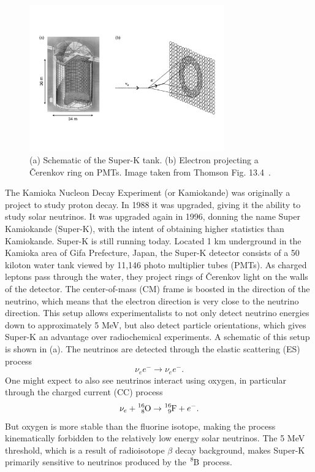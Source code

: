 \begin{figure}
  \centering
  \includegraphics[width=0.75\textwidth,keepaspectratio]
                {pictures/t13_4.pdf}
  \vspace{-10mm}
  \caption{(a) Schematic of the Super-K tank. (b) Electron
           projecting a \v{C}erenkov ring on PMTs. Image taken
           from Thomson Fig. 13.4~\cite{thomson_modern_2013}.}
  \label{fig:cerenkov}
\end{figure}

The Kamioka Nucleon Decay Experiment (or Kamiokande) was
originally a project to study proton decay. In 1988 it was
upgraded, giving it the ability to study solar neutrinos. It was upgraded
again in 1996, donning the name Super Kamiokande (Super-K), with the intent
of obtaining higher statistics than Kamiokande. Super-K is still running today.
Located 1 km underground in the Kamioka area of Gifa Prefecture, Japan,
the Super-K detector consists of a 50 kiloton water tank viewed by 11,146
photo multiplier tubes (PMTs). As charged leptons pass through the water,
they project rings of \v{C}erenkov light on the walls of the detector. The
center-of-mass (CM)
frame is boosted in the direction of the neutrino, which means that the
electron direction is very close to the neutrino direction. This setup
allows experimentalists to not only detect neutrino energies down to
approximately 5 MeV, but also detect particle orientations, which gives Super-K
an advantage over radiochemical experiments. A schematic of this setup
is shown in  (a).
The neutrinos are detected through the elastic scattering (ES) process
\begin{equation}
  \nu_ee^-\to\nu_ee^-. 
\end{equation}
One might expect to also see neutrinos interact
using oxygen, in particular through the charged current (CC) process
\begin{equation}
  \nu_e+\ce{^{16}_8O}\to\ce{^{16}_9F}+e^-.
\end{equation}
But oxygen is more stable than the fluorine isotope, making the process
kinematically forbidden to the relatively low energy solar neutrinos. The 5
MeV threshold, which is a result of radioisotope $\beta$ decay background,
 makes Super-K primarily sensitive to neutrinos produced by
the $\ce{^8B}$ process.

